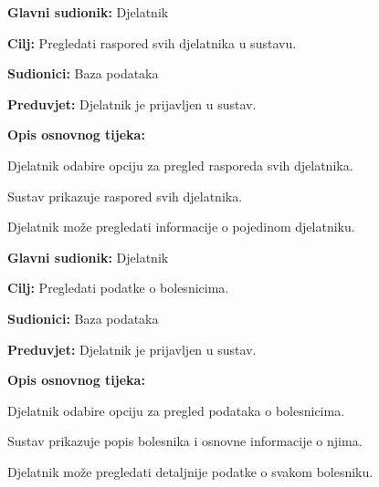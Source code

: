 \documentclass{article}
\begin{document}
\vspace{1em} %
\begin{packed_item}
\item \textbf{Glavni sudionik:} Djelatnik
\item \textbf{Cilj:} Pregledati raspored svih djelatnika u sustavu.
\item \textbf{Sudionici:} Baza podataka
\item \textbf{Preduvjet:} Djelatnik je prijavljen u sustav.
\item \textbf{Opis osnovnog tijeka:}
\begin{packed_enum}
\item Djelatnik odabire opciju za pregled rasporeda svih djelatnika.
\item Sustav prikazuje raspored svih djelatnika.
\item Djelatnik može pregledati informacije o pojedinom djelatniku.
\end{packed_enum}
\end{packed_item}
\vspace{1em} %

\begin{packed_item}
\item \textbf{Glavni sudionik:} Djelatnik
\item \textbf{Cilj:} Pregledati podatke o bolesnicima.
\item \textbf{Sudionici:} Baza podataka
\item \textbf{Preduvjet:} Djelatnik je prijavljen u sustav.
\item \textbf{Opis osnovnog tijeka:}
\begin{packed_enum}
\item Djelatnik odabire opciju za pregled podataka o bolesnicima.
\item Sustav prikazuje popis bolesnika i osnovne informacije o njima.
\item Djelatnik može pregledati detaljnije podatke o svakom bolesniku.
\end{packed_enum}
\end{packed_item}
\end{document}
